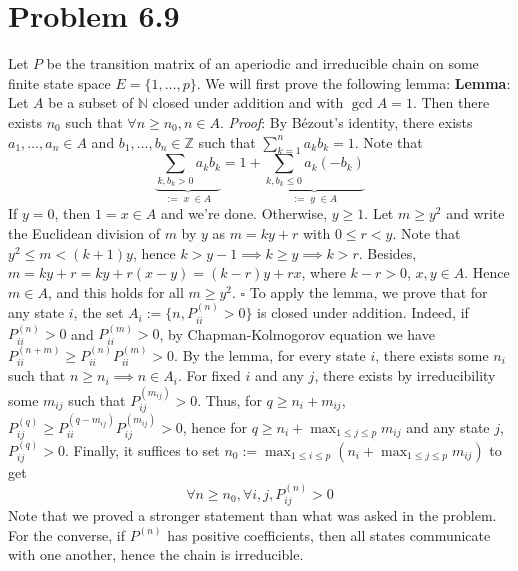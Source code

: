 \documentclass[a4paper,11pt]{article}
\begin{document}
\section*{Problem 6.9}
Let $P$ be the transition matrix of an aperiodic and irreducible chain on some finite state space $E=\{1,\ldots,p\}$. We will first prove the following lemma:\newline
\textbf{Lemma}: Let $A$ be a subset of $\mathbb N$ closed under addition and with $\gcd A = 1$. Then there exists $n_0$ such that $\forall n\geq n_0, n\in A$.\newline
\textit{Proof}: By Bézout's identity, there exists $a_1,\ldots, a_n\in A$ and $b_1,\ldots,b_n\in \mathbb Z$ such that $\sum_{k=1}^n a_kb_k =1$. Note that $$\underbrace{\sum_{k, b_k>0} a_k b_k}_{:=\;x\;\in A} = 1 + \underbrace{\sum_{k, b_k\leq0} a_k (-b_k)}_{:= \;y\;\in A}$$
If $y=0$, then $1=x\in A$ and we're done. Otherwise, $y\geq 1$. Let $m\geq y^2$ and write the Euclidean division of $m$ by $y$ as $m=ky+r$ with $0\leq r<y$. Note that $y^2\leq m < (k+1)y$, hence $k>y-1\implies k\geq y\implies k>r$. Besides, $m = ky+r = ky + r(x-y) = (k-r)y + rx$, where $k-r>0$, $x,y\in A$. Hence $m\in A$, and this holds for all $m\geq y^2$. \hfill $\square$\newline\newline
To apply the lemma, we prove that for any state $i$, the set $A_i:=\{n, P_{ii}^{(n)} >0\}$ is closed under addition. Indeed, if $P_{ii}^{(n)} >0$ and $P_{ii}^{(m)} >0$, by Chapman-Kolmogorov equation we have $P_{ii}^{(n+m)}\geq P_{ii}^{(n)}P_{ii}^{(m)}>0$. By the lemma, for every state $i$, there exists some $n_i$ such that $n\geq n_i\implies n\in A_i$. For fixed $i$ and any $j$, there exists by irreducibility some $m_{ij}$ such that $P_{ij}^{(m_{ij})} >0$. Thus, for $q\geq n_i + m_{ij}$, $P_{ij}^{(q)}\geq P_{ii}^{(q-m_{ij})} P_{ij}^{(m_{ij})}>0$, hence for $q\geq n_i + \max_{1\leq j\leq p} m_{ij}$ and any state $j$,  $P_{ij}^{(q)}>0$. Finally, it suffices to set $n_0:=\max_{1\leq i\leq p} (n_i + \max_{1\leq j\leq p} m_{ij})$ to get $$\forall n\geq n_0, \forall i,j, P_{ij}^{(n)}>0$$
Note that we proved a stronger statement than what was asked in the problem.\newline \newline
For the converse, if $P^{(n)}$ has positive coefficients, then all states communicate with one another, hence the chain is irreducible.
\end{document}
